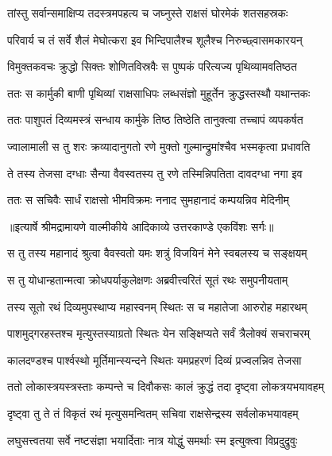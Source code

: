 \twolineshloka
{तांस्तु सर्वान्समाक्षिप्य तदस्त्रमपहत्य च}
{जघ्नुस्ते राक्षसं घोरमेकं शतसहस्रकः} %

\twolineshloka
{परिवार्य च तं सर्वे शैलं मेघोत्करा इव}
{भिन्दिपालैश्च शूलैश्च निरुच्छ्वासमकारयन्} %

\twolineshloka
{विमुक्तकवचः क्रुद्धो सिक्तः शोणितविस्रवैः}
{स पुष्पकं परित्यज्य पृथिव्यामवतिष्ठत} %

\twolineshloka
{ततः स कार्मुकी बाणी पृथिव्यां राक्षसाधिपः}
{लब्धसंज्ञो मुहूर्तेन क्रुद्धस्तस्थौ यथान्तकः} %

\twolineshloka
{ततः पाशुपतं दिव्यमस्त्रं सन्धाय कार्मुके}
{तिष्ठ तिष्ठेति तानुक्त्वा तच्चापं व्यपकर्षत} %

\twolineshloka
{ज्वालामाली स तु शरः क्रव्यादानुगतो रणे}
{मुक्तो गुल्मान्द्रुमांश्चैव भस्मकृत्वा प्रधावति} %

\twolineshloka
{ते तस्य तेजसा दग्धाः सैन्या वैवस्वतस्य तु}
{रणे तस्मिन्निपतिता दावदग्धा नगा इव} %

\twolineshloka
{ततः स सचिवैः सार्धं राक्षसो भीमविक्रमः}
{ननाद सुमहानादं कम्पयन्निव मेदिनीम्} %


{॥इत्यार्षे श्रीमद्रामायणे वाल्मीकीये आदिकाव्ये उत्तरकाण्डे एकविंशः सर्गः॥}


\twolineshloka
{स तु तस्य महानादं श्रुत्वा वैवस्वतो यमः}
{शत्रुं विजयिनं मेने स्वबलस्य च सङ्क्षयम्} %

\twolineshloka
{स तु योधान्हतान्मत्वा क्रोधपर्याकुलेक्षणः}
{अब्रवीत्त्वरितं सूतं रथः समुपनीयताम्} %

\twolineshloka
{तस्य सूतो रथं दिव्यमुपस्थाप्य महास्वनम्}
{स्थितः स च महातेजा आरुरोह महारथम्} %

\twolineshloka
{पाशमुद्गरहस्तश्च मृत्युस्तस्याग्रतो स्थितः}
{येन सङ्क्षिप्यते सर्वं त्रैलोक्यं सचराचरम्} %

\twolineshloka
{कालदण्डश्च पार्श्वस्थो मूर्तिमान्स्यन्दने स्थितः}
{यमप्रहरणं दिव्यं प्रज्वलन्निव तेजसा} %

\twolineshloka
{ततो लोकास्त्रयस्त्रस्ताः कम्पन्ते च दिवौकसः}
{कालं क्रुद्धं तदा दृष्ट्वा लोकत्रयभयावहम्} %

\twolineshloka
{दृष्ट्वा तु ते तं विकृतं रथं मृत्युसमन्वितम्}
{सचिवा राक्षसेन्द्रस्य सर्वलोकभयावहम्} %

\twolineshloka
{लघुसत्त्वतया सर्वे नष्टसंज्ञा भयार्दिताः}
{नात्र योद्धुं समर्थाः स्म इत्युक्त्वा विप्रदुद्रुवुः} %

